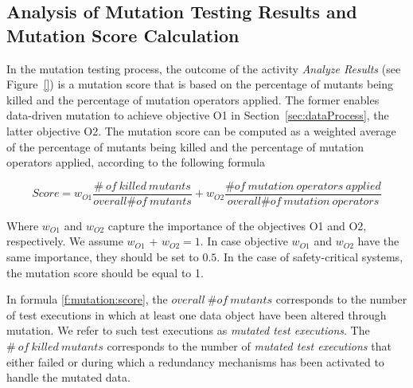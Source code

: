 
\newcommand{\ONMO}{\mathit{overall}\ \# \mathit{of}\ \mathit{mutation} \ \mathit{operators}}
\newcommand{\NMOA}{\# \mathit{of}\ \mathit{mutation} \ \mathit{operators} \ \mathit{applied}}


\subsection{Analysis of Mutation Testing Results and Mutation Score Calculation}
\label{sec:mutationscore}

In the mutation testing process, the outcome of the activity \emph{Analyze Results} (see Figure~\ref{}) is a mutation score that is based on
the percentage of mutants being killed and the percentage of mutation operators applied. 
The former enables data-driven mutation to achieve objective O1 in Section~\ref{sec:dataProcess}, the latter objective O2. 
The mutation score can be computed as a weighted average of the percentage of mutants being killed and the percentage of mutation operators applied, according to the following formula

\begin{equation}
Score=w_{O1} \frac{\# \ \mathit{of}\ \mathit{killed} \ \mathit{mutants}}{\mathit{overall} \# \mathit{of}\ \mathit{mutants}} + w_{O2} \frac{\# \mathit{of}\ \mathit{mutation} \ \mathit{operators} \ \mathit{applied}}{\mathit{overall} \# \mathit{of}\ \mathit{mutation} \ \mathit{operators}}
\label{f:mutation:score}
\end{equation}

Where $w_{O1}$ and $w_{O2}$ capture the importance of the objectives O1 and O2, respectively. We assume $w_{O1}$ + $w_{O2} = 1$. In case objective $w_{O1}$ and $w_{O2}$ have the same importance, they should be set to $0.5$. In the case of safety-critical systems, the mutation score should be equal to 1.

In formula \ref{f:mutation:score}, the $\mathit{overall}\ \# \mathit{of}\ \mathit{mutants}$ corresponds to the number of test executions in which at least one data object have been altered through mutation. We refer to such test executions as \emph{mutated test executions}.
The $\# \ \mathit{of}\ \mathit{killed} \ \mathit{mutants}$ corresponds to the number of \emph{mutated test executions} that either failed or during which a redundancy mechanisms has been activated to handle the mutated data.

